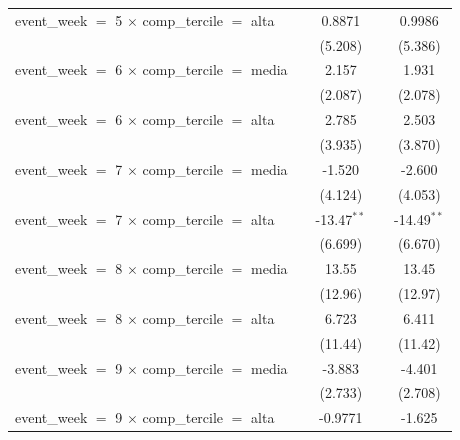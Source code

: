 \begin{tabular}{lcccc}
   event\_week $=$ 5 $\times$ comp\_tercile $=$ alta       &                & 0.8871        &              & 0.9986\\   
                                                           &                & (5.208)       &              & (5.386)\\   
   event\_week $=$ 6 $\times$ comp\_tercile $=$ media      &                & 2.157         &              & 1.931\\   
                                                           &                & (2.087)       &              & (2.078)\\   
   event\_week $=$ 6 $\times$ comp\_tercile $=$ alta       &                & 2.785         &              & 2.503\\   
                                                           &                & (3.935)       &              & (3.870)\\   
   event\_week $=$ 7 $\times$ comp\_tercile $=$ media      &                & -1.520        &              & -2.600\\   
                                                           &                & (4.124)       &              & (4.053)\\   
   event\_week $=$ 7 $\times$ comp\_tercile $=$ alta       &                & -13.47$^{**}$ &              & -14.49$^{**}$\\   
                                                           &                & (6.699)       &              & (6.670)\\   
   event\_week $=$ 8 $\times$ comp\_tercile $=$ media      &                & 13.55         &              & 13.45\\   
                                                           &                & (12.96)       &              & (12.97)\\   
   event\_week $=$ 8 $\times$ comp\_tercile $=$ alta       &                & 6.723         &              & 6.411\\   
                                                           &                & (11.44)       &              & (11.42)\\   
   event\_week $=$ 9 $\times$ comp\_tercile $=$ media      &                & -3.883        &              & -4.401\\   
                                                           &                & (2.733)       &              & (2.708)\\   
   event\_week $=$ 9 $\times$ comp\_tercile $=$ alta       &                & -0.9771       &              & -1.625\\   

\end{tabular}

